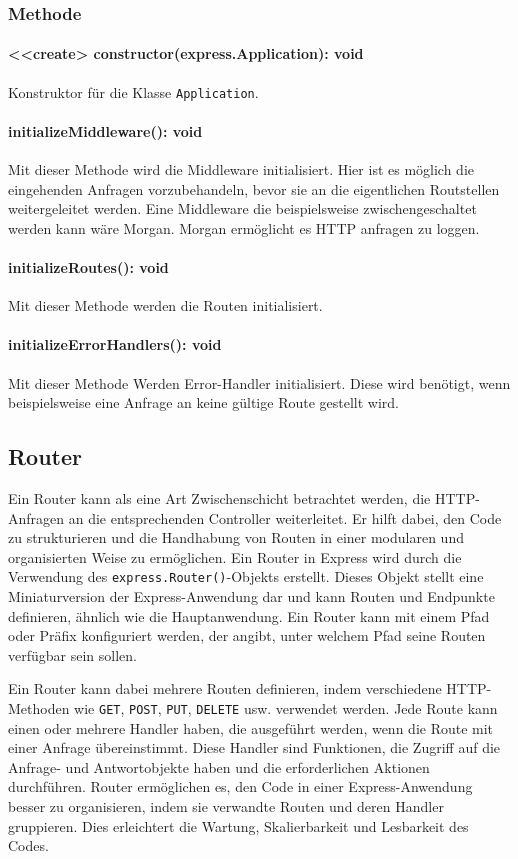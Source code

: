 \documentclass[parskip=full]{scrartcl}
\begin{document}
\subsubsection*{Methode}
\paragraph{<<create> constructor(express.Application): void}Konstruktor für die Klasse \texttt{Application}.
\paragraph{initializeMiddleware(): void}Mit dieser Methode wird die Middleware initialisiert. Hier ist es möglich die eingehenden Anfragen vorzubehandeln, bevor sie an die eigentlichen Routstellen weitergeleitet werden.
Eine Middleware die beispielsweise zwischengeschaltet werden kann wäre Morgan. Morgan ermöglicht es HTTP anfragen zu loggen.
\paragraph{initializeRoutes(): void}Mit dieser Methode werden die Routen initialisiert.
\paragraph{initializeErrorHandlers(): void}Mit dieser Methode Werden Error-Handler initialisiert. Diese wird benötigt, wenn beispielsweise eine Anfrage an keine gültige Route gestellt wird.

\subsection{Router}
Ein Router kann als eine Art Zwischenschicht betrachtet werden, die HTTP-Anfragen an die entsprechenden Controller weiterleitet.
Er hilft dabei, den Code zu strukturieren und die Handhabung von Routen in einer modularen und organisierten Weise zu ermöglichen.
Ein Router in Express wird durch die Verwendung des \texttt{express.Router()}-Objekts erstellt.
Dieses Objekt stellt eine Miniaturversion der Express-Anwendung dar und kann Routen und Endpunkte definieren, ähnlich wie die Hauptanwendung.
Ein Router kann mit einem Pfad oder Präfix konfiguriert werden, der angibt, unter welchem Pfad seine Routen verfügbar sein sollen.

Ein Router kann dabei mehrere Routen definieren, indem verschiedene HTTP-Methoden wie \texttt{GET}, \texttt{POST}, \texttt{PUT}, \texttt{DELETE} usw. verwendet werden.
Jede Route kann einen oder mehrere Handler haben, die ausgeführt werden, wenn die Route mit einer Anfrage übereinstimmt.
Diese Handler sind Funktionen, die Zugriff auf die Anfrage- und Antwortobjekte haben und die erforderlichen Aktionen durchführen.
Router ermöglichen es, den Code in einer Express-Anwendung besser zu organisieren, indem sie verwandte Routen und deren Handler gruppieren.
Dies erleichtert die Wartung, Skalierbarkeit und Lesbarkeit des Codes.
\end{document}
